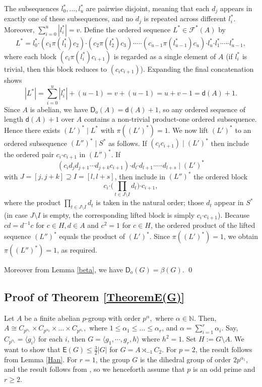 \documentclass[a4paper,11pt]{article}
\numberwithin{equation}{section}
\newcommand{\bdot}{\boldsymbol{\cdot}}
\newcommand{\no}{\noindent}
\begin{document}
The subsequences $l_0^{\ast},\dots,l_u^{\ast}$ are pairwise disjoint, meaning that each $d_j$ appears in exactly one of these subsequences, and no $d_j$ is repeated across different $l_i^{\ast}$. Moreover, $\sum_{i=0}^u|l^{\ast}_i|=v$. Define the ordered sequence $L^{\ast}\in\mathcal F^{\ast}(A)$ by
\[
L^{\ast}
= l^{\ast}_0\bdot (c_1\pi(l^{\ast}_1)c_2)\bdot (c_2\pi(l^{\ast}_2)c_3)\bdot\cdots\bdot (c_{u-1}\pi(l^{\ast}_{u-1})c_u)\bdot l^{\ast}_u\bdot l^{\ast}_1\bdot\cdots\bdot l^{\ast}_{u-1},
\]
where each block \((c_i\pi(l^{\ast}_i)c_{i+1})\) is regarded as a single element of \(A\) (if \(l_i^{\ast}\) is trivial, then this block reduces to \((c_ic_{i+1})\)). Expanding the final concatenation shows
\[
|L^{\ast}| = \sum_{i=0}^u |l_i^{\ast}| + (u-1) = v + (u-1) = u+v-1 = \mathsf d(A)+1.
\]
Since $A$ is abelian, we have $\mathsf D_o(A)=\mathsf d(A)+1$, so any ordered sequence of length $\mathsf d(A)+1$ over $A$ contains a non-trivial product-one ordered subsequence. Hence there exists $(L')^{\ast}\mid L^{\ast}$ with $\pi((L')^{\ast})=1$. We now lift $(L')^{\ast}$ to an ordered subsequence $(L'')^{\ast}\mid S^{\ast}$ as follows. If $(c_ic_{i+1})\mid (L')^{\ast}$ then include the ordered pair $c_i\bdot c_{i+1}$ in $(L'')^{\ast}$.  If
\[
(c_i d_j d_{j+1}\cdots d_{j+k} c_{i+1})\bdot d_l\bdot d_{l+1}\bdot\cdots\bdot d_{l+s}\mid (L')^{\ast}
\]
with $J=[j,j+k]\supseteq I=[l,l+s]$, then include in $(L'')^{\ast}$ the ordered block
\[
c_i\bdot\biggl(\prod_{t\in J\setminus I} d_t\biggr)\bdot c_{i+1},
\]
where the product $\prod_{t\in J\setminus I} d_t$ is taken in the natural order; those $d_t$ appear in $S^{\ast}$ (in case \(J \setminus I\) is empty, the corresponding lifted block is simply \(c_i \bdot c_{i+1}\)). Because $cd=d^{-1}c$ for $c\in H,d\in A$ and $c^2=1$ for $c\in H$, the ordered product of the lifted sequence $(L'')^{\ast}$ equals the product of $(L')^{\ast}$.  Since $\pi((L')^{\ast})=1$, we obtain $\pi((L'')^{\ast})=1$, as required.

\no Moreover from Lemma \ref{beta}, we have $\mathsf{D}_o(G)=\beta (G).$ 
\qed



\subsection*{Proof of Theorem \ref{TheoremE(G)}}
Let $A$ be a finite abelian $p$-group with order $p^{\alpha},$ where $\alpha \in \mathbb{N}.$ Then, $A\cong C_{p^{\alpha_1}}\times C_{p^{\alpha_2}}\times \dotsc \times C_{p^{\alpha_r}},$ where $1 \le \alpha_1 \le \dotsc \le \alpha_r$, and $\alpha=\sum_{i=1}^r\alpha_i.$ Say, $C_{p^{\alpha_i}}= \langle g_i \rangle$ for each $i$, then $G=\langle g_1,\cdots,g_r,h \rangle$ where $h^2=1.$
Set $H:=G \setminus A$.
We want to show that $\mathsf{E}(G) \le \frac{3}{2}|G| $ for $G= A \rtimes_{-1} C_2.$ For $p=2$, the result follows from Lemma \ref{Han}. For $r=1$, the group $G$ is the dihedral group of order $2p^{\alpha_1}$, and the result follows from \cite[Theorem~8]{BAS2007}, so we henceforth assume that $p$ is an odd prime and $r \ge 2$.
\end{document}
